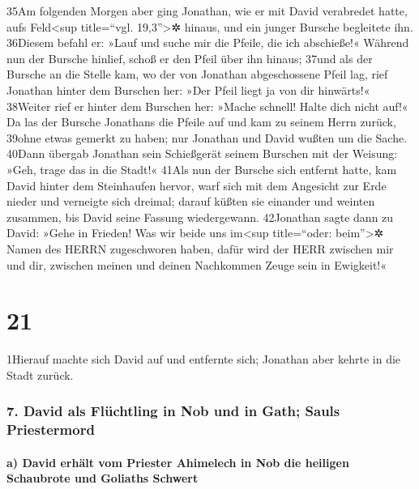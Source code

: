 35Am folgenden Morgen aber ging Jonathan, wie er mit David verabredet
hatte, aufs Feld\textless sup title=``vgl. 19,3''\textgreater✲ hinaus,
und ein junger Bursche begleitete ihn. 36Diesem befahl er: »Lauf und
suche mir die Pfeile, die ich abschieße!« Während nun der Bursche
hinlief, schoß er den Pfeil über ihn hinaus; 37und als der Bursche an
die Stelle kam, wo der von Jonathan abgeschossene Pfeil lag, rief
Jonathan hinter dem Burschen her: »Der Pfeil liegt ja von dir hinwärts!«
38Weiter rief er hinter dem Burschen her: »Mache schnell! Halte dich
nicht auf!« Da las der Bursche Jonathans die Pfeile auf und kam zu
seinem Herrn zurück, 39ohne etwas gemerkt zu haben; nur Jonathan und
David wußten um die Sache. 40Dann übergab Jonathan sein Schießgerät
seinem Burschen mit der Weisung: »Geh, trage das in die Stadt!« 41Als
nun der Bursche sich entfernt hatte, kam David hinter dem Steinhaufen
hervor, warf sich mit dem Angesicht zur Erde nieder und verneigte sich
dreimal; darauf küßten sie einander und weinten zusammen, bis David
seine Fassung wiedergewann. 42Jonathan sagte dann zu David: »Gehe in
Frieden! Was wir beide uns im\textless sup title=``oder:
beim''\textgreater✲ Namen des HERRN zugeschworen haben, dafür wird der
HERR zwischen mir und dir, zwischen meinen und deinen Nachkommen Zeuge
sein in Ewigkeit!«

\hypertarget{section-20}{%
\section{21}\label{section-20}}

1Hierauf machte sich David auf und entfernte sich; Jonathan aber kehrte
in die Stadt zurück.

\hypertarget{david-als-fluxfcchtling-in-nob-und-in-gath-sauls-priestermord}{%
\subsubsection{7. David als Flüchtling in Nob und in Gath; Sauls
Priestermord}\label{david-als-fluxfcchtling-in-nob-und-in-gath-sauls-priestermord}}

\hypertarget{a-david-erhuxe4lt-vom-priester-ahimelech-in-nob-die-heiligen-schaubrote-und-goliaths-schwert}{%
\paragraph{a) David erhält vom Priester Ahimelech in Nob die heiligen
Schaubrote und Goliaths
Schwert}\label{a-david-erhuxe4lt-vom-priester-ahimelech-in-nob-die-heiligen-schaubrote-und-goliaths-schwert}}

